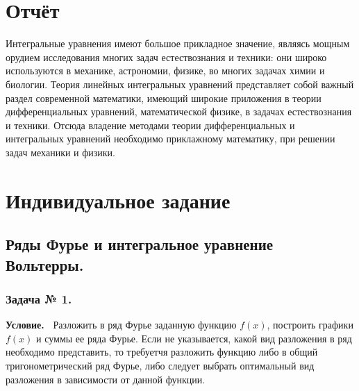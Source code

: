 \documentclass[12pt]{article}
\begin{document}
\newpage
\section{Отчёт}
Интегральные уравнения имеют большое прикладное значение, являясь мощным
орудием исследования многих задач естествознания и техники: они широко используются
в механике, астрономии, физике, во многих задачах химии и биологии. Теория линейных
интегральных уравнений представляет собой важный раздел современной математики,
имеющий широкие приложения в теории дифференциальных уравнений, математической
физике, в задачах естествознания и техники. Отсюда владение методами теории
дифференциальных и интегральных уравнений необходимо приклажному математику, при решении задач
механики и физики.

\newpage
\section{Индивидуальное задание}
%

\subsection{Ряды Фурье и интегральное уравнение Вольтерры.}



\subsubsection*{\center Задача № 1.}
{\bf Условие.~}
Разложить в ряд Фурье заданную функцию $f(x)$, построить графики $f(x)$ и суммы ее ряда Фурье. Если не указывается, какой вид разложения в ряд необходимо представить, то требуетчя разложить функцию либо в общий тригонометрический ряд Фурье, либо следует выбрать оптимальный вид разложения в зависимости от данной функции.
\end{document}
